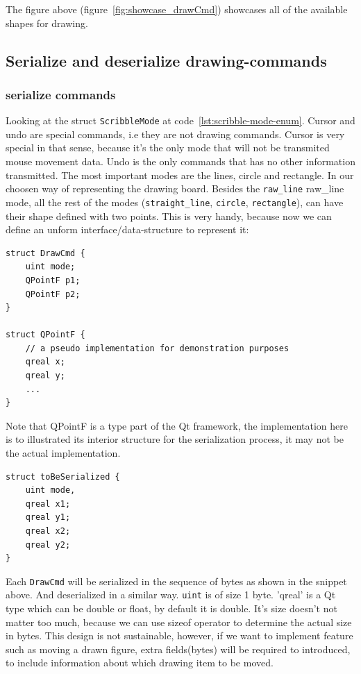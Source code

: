 \documentclass[11pt]{article}
\begin{document}
\begin{multicols*}{2}
The figure above (figure~\ref{fig:showcase_drawCmd}) showcases all of the available shapes for drawing.

\subsection{Serialize and deserialize drawing-commands}

\subsubsection{serialize commands}

Looking at the struct \verb|ScribbleMode| at code~\ref{lst:scribble-mode-enum}.
Cursor and undo are special commands, i.e they are not drawing commands.
Cursor is very special in that sense, because it's the only mode that will not be transmited mouse movement data.
Undo is the only commands that has no other information transmitted.
The most important modes are the lines, circle and rectangle.
In our choosen way of representing the drawing board. Besides the \verb|raw_line| raw\_line mode, all the rest of the modes (\verb|straight_line|, \verb|circle|, \verb|rectangle|), can have their shape defined with two points. This is very handy, because now we can define an unform interface/data-structure to represent it:

\begin{lstlisting}[caption={DrawCmd struct}]
struct DrawCmd {
    uint mode;
    QPointF p1;
    QPointF p2;
}

struct QPointF {
    // a pseudo implementation for demonstration purposes
    qreal x;
    qreal y;
    ...
}
\end{lstlisting}

Note that QPointF is a type part of the Qt framework, the implementation here is to illustrated its interior structure for the serialization process, it may not be the actual implementation.

\begin{lstlisting}[label=lst:deserialization-sequence, caption={How DrawCmd will be structured put into a struct}]
struct toBeSerialized {
    uint mode,
    qreal x1;
    qreal y1;
    qreal x2;
    qreal y2;
}
\end{lstlisting}

Each \verb|DrawCmd| will be serialized in the sequence of bytes as shown in the snippet above. And deserialized in a similar way.
\verb|uint| is of size 1 byte. 'qreal' is a Qt type which can be double or float, by default it is double. It's size doesn't not matter too much, because we can use sizeof operator to determine the actual size in bytes. 
This design is not sustainable, however, if we want to implement feature such as moving a drawn figure, extra fields(bytes) will be required to introduced, to include information about which drawing item to be moved.


\end{multicols*}
\end{document}
